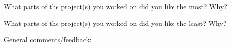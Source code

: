 \documentclass[12pt]{article}
\begin{document}
\begin{exam}{}
\newpage
\begin{problem}
What parts of the project(s) you worked on did you like the most? Why?
\end{problem}
\vspace{2.75in}

\begin{problem}
What parts of the project(s) you worked on did you like the least? Why?
\end{problem}
\vspace{2.75in}

\begin{problem}
General comments/feedback:
\end{problem}

\end{exam}
\end{document}
